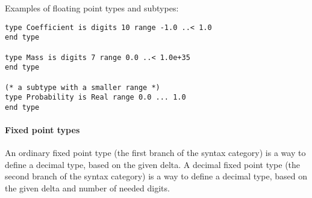 \example Examples of floating point types and subtypes:
\begin{lstlisting}
type Coefficient is digits 10 range -1.0 ..< 1.0 
end type

type Mass is digits 7 range 0.0 ..< 1.0e+35 
end type

(* a subtype with a smaller range *)
type Probability is Real range 0.0 ... 1.0
end type
\end{lstlisting}

\paragraph{Fixed point types}
An ordinary fixed point type (the first branch of the  syntax category) is a way to define a decimal type, based on the given delta. 
A decimal fixed point type (the second branch of the  syntax category) is a way to define a decimal type, based on the given delta and number of needed digits.  
